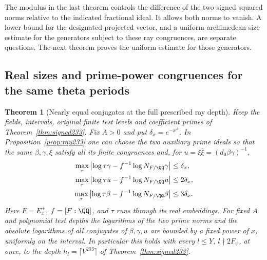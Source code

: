 \documentclass[a4paper,11pt]{article}
\newtheorem{theorem}[proposition]{Theorem}
\theoremstyle{definition}
\theoremstyle{remark}
\numberwithin{equation}{section}
\begin{document}
The modulus in the last theorem controls the difference of the two
signed squared norms relative to the indicated fractional ideal.
It allows both norms to vanish. A lower bound for the designated
projected vector, and a uniform archimedean size estimate for the
generators subject to these ray congruences, are separate questions. The next theorem proves the uniform estimate for those generators.

\subsection{Real sizes and prime-power congruences for the same theta periods}\label{nav:V-28}
\begin{theorem}[Nearly equal conjugates at the full prescribed ray depth]
\label{thm:balanced234}
Keep the fields, intervals, original finite test levels and
coefficient primes of Theorem~\ref{thm:signed233}. Fix \(A>0\)
and put \(\delta_x=e^{-x^A}\). In Proposition~\ref{prop:ray233}
one can choose the two auxiliary prime ideals so that
the same \(\beta,\gamma,\xi\) satisfy all its finite congruences
and, for \(u=\xi\bar\xi=(d_0\beta\gamma)^{-1}\),
\[
 \begin{split}
 \max_\tau\left|\log\tau\gamma-f^{-1}\log N_{F/\QQ}\gamma\right|
             &\le\delta_x,\\
 \max_\tau\left|\log\tau u-f^{-1}\log N_{F/\QQ}u\right|
             &\le2\delta_x,\\
 \max_\tau\left|\log\tau\beta-f^{-1}\log N_{F/\QQ}\beta\right|
             &\le3\delta_x.
 \end{split}
\]
Here \(F=E_x^+\), \(f=[F:\QQ]\), and \(\tau\) runs through its
real embeddings. For fixed \(A\) and polynomial test depths the
logarithms of the two prime norms and the absolute logarithms
of all conjugates of \(\beta,\gamma,u\) are bounded by a fixed
power of \(x\), uniformly on the interval. In particular this
holds with every \(l\le Y,\ l\nmid2F_\psi\), at once, to the
depth \(h_l=\lceil V^{203}\rceil\) of Theorem~\ref{thm:signed233}.
\end{theorem}
\end{document}
